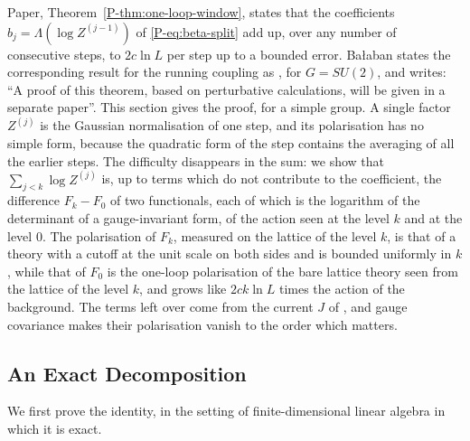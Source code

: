 \documentclass[11pt]{preprint}
\numberwithin{equation}{section}
\theoremstyle{definition}
\theoremstyle{remark}
\theoremstyle{plain}
\begin{document}
Paper, Theorem~\ref{P-thm:one-loop-window}, states that the coefficients $b_j = \Lambda(\log Z^{(j-1)})$ of \eqref{P-eq:beta-split} add up, over any number of consecutive steps, to $2c\ln L$ per step up to a bounded error. Ba{\l}aban states the corresponding result for the running coupling as \cite[Theorem~2, p.~259]{BalabanRG1}, for $G = SU(2)$, and writes: ``A proof of this theorem, based on perturbative calculations, will be given in a separate paper''. This section gives the proof, for a simple group. A single factor $Z^{(j)}$ is the Gaussian normalisation of one step, and its polarisation has no simple form, because the quadratic form of the step contains the averaging of all the earlier steps. The difficulty disappears in the sum: we show that $\sum_{j<k}\log Z^{(j)}$ is, up to terms which do not contribute to the coefficient, the difference $F_k - F_0$ of two functionals, each of which is the logarithm of the determinant of a gauge-invariant form, of the action seen at the level $k$ and at the level $0$. The polarisation of $F_k$, measured on the lattice of the level $k$, is that of a theory with a cutoff at the unit scale on both sides and is bounded uniformly in $k$, while that of $F_0$ is the one-loop polarisation of the bare lattice theory seen from the lattice of the level $k$, and grows like $2ck\ln L$ times the action of the background. The terms left over come from the current $J$ of \cite[(1.8), p.~261]{BalabanRG1}, and gauge covariance makes their polarisation vanish to the order which matters.

\subsection{An Exact Decomposition}\label{sec:exact-decomposition}

We first prove the identity, in the setting of finite-dimensional linear algebra in which it is exact.
\end{document}
